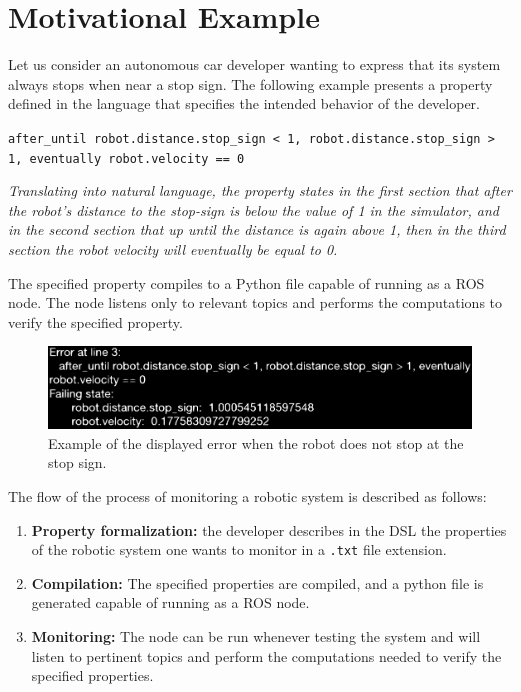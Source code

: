 \chapter{Motivational Example}
\label{chap:motivationalexample}

Let us consider an autonomous car developer wanting to express that its system always stops when near a stop sign. The following example presents a property defined in the language that specifies the intended behavior of the developer.


\texttt{after\_until robot.distance.stop\_sign < 1, robot.distance.stop\_sign > 1, eventually robot.velocity == 0}

\textit{Translating into natural language, the property states in the first section that after the robot's distance to the stop-sign is below the value of 1 in the simulator, and in the second section that up until the distance is again above 1, then in the third section the robot velocity will eventually be equal to 0.}

The specified property compiles to a Python file capable of running as a ROS node. The node listens only to relevant topics and performs the computations to verify the specified property.

\begin{figure}
\includegraphics[width=\textwidth]{images/error.eps}
\caption{Example of the displayed error when the robot does not stop at the stop sign.} \label{fig1}
\end{figure}

The flow of the process of monitoring a robotic system is described as follows:

\begin{enumerate}[label=(\roman*)]
    \item \textbf{Property formalization:} the developer describes in the DSL the properties of the robotic system one wants to monitor in a \texttt{.txt} file extension.
    \item \textbf{Compilation:} The specified properties are compiled, and a python file is generated capable of running as a ROS node.
    \item \textbf{Monitoring:} The node can be run whenever testing the system and will listen to pertinent topics and perform the computations needed to verify the specified properties.
\end{enumerate}